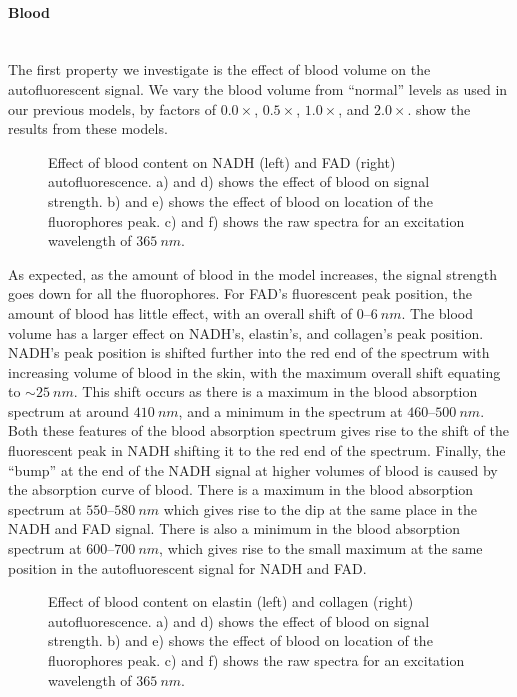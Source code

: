 \paragraph*{Blood}\hspace{0pt}\\
The first property we investigate is the effect of blood volume on the autofluorescent signal.
We vary the blood volume from ``normal'' levels as used in our previous models, by factors of $0.0\times$, $0.5\times$, $1.0\times$, and $2.0\times$.
 show the results from these models.

\begin{figure}[!htbp]
    \centering
    \caption{Effect of blood content on NADH (left) and FAD (right) autofluorescence. a) and d) shows the effect of blood on signal strength. b) and e) shows the effect of blood on location of the fluorophores peak. c) and f) shows the raw spectra for an excitation wavelength of $365~nm$.}%
    \label{fig:nadhfad-blood}%
\end{figure}

As expected, as the amount of blood in the model increases, the signal strength goes down for all the fluorophores.
For FAD's fluorescent peak position, the amount of blood has little effect, with an overall shift of $0$--$6~nm$.
The blood volume has a larger effect on NADH's, elastin's, and collagen's peak position.
NADH's peak position is shifted further into the red end of the spectrum with increasing volume of blood in the skin, with the maximum overall shift equating to $\sim25~nm$.
This shift occurs as there is a maximum in the blood absorption spectrum at around $410~nm$, and a minimum in the spectrum at $460$--$500~nm$.
Both these features of the blood absorption spectrum gives rise to the shift of the fluorescent peak in NADH shifting it to the red end of the spectrum.
Finally, the ``bump'' at the end of the NADH signal at higher volumes of blood is caused by the absorption curve of blood.
There is a maximum in the blood absorption spectrum at $550$--$580~nm$ which gives rise to the dip at the same place in the NADH and FAD signal.
There is also a minimum in the blood absorption spectrum at $600$--$700~nm$, which gives rise to the small maximum at the same position in the autofluorescent signal for NADH and FAD.

\begin{figure}[!htbp]
    \centering
    \caption{Effect of blood content on elastin (left) and collagen (right) autofluorescence. a) and d) shows the effect of blood on signal strength. b) and e) shows the effect of blood on location of the fluorophores peak. c) and f) shows the raw spectra for an excitation wavelength of $365~nm$.}%
    \label{fig:elscol-blood}%
\end{figure}

